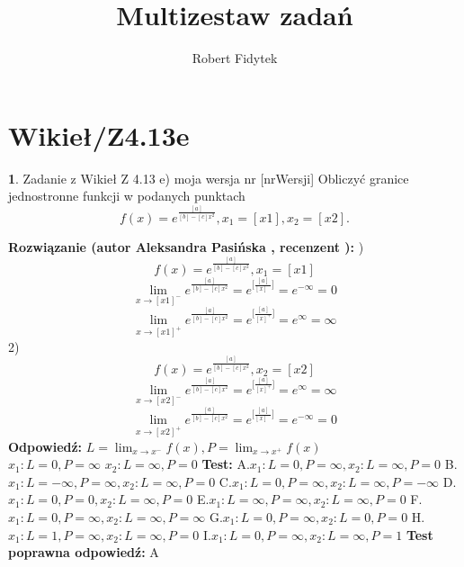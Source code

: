 \documentclass[12pt, a4paper]{article}
\title{Multizestaw zadań}
\author{Robert Fidytek}
\date{}
\theoremstyle{definition} %
\newtheorem{zad}{}
\newcommand{\kategoria}[1]{\section{#1}} %
\newcommand{\zadStart}[1]{\begin{zad}#1\newline} %
\newcommand{\zadStop}{\end{zad}}   %
\newcommand{\rozwStart}[2]{\noindent \textbf{Rozwiązanie (autor #1 , recenzent #2): }\newline} %
\newcommand{\rozwStop}{\newline}                                            %
\newcommand{\odpStart}{\noindent \textbf{Odpowiedź:}\newline}    %
\newcommand{\odpStop}{\newline}                                             %
\newcommand{\testStart}{\noindent \textbf{Test:}\newline} %
\newcommand{\testStop}{\newline} %
\newcommand{\kluczStart}{\noindent \textbf{Test poprawna odpowiedź:}\newline} %
\newcommand{\kluczStop}{\newline} %
\begin{document}
\maketitle


\kategoria{Wikieł/Z4.13e}
\zadStart{Zadanie z Wikieł Z 4.13 e) moja wersja nr [nrWersji]}
Obliczyć granice jednostronne funkcji w podanych punktach $$f(x)=e^\frac{[a]}{[b]-[c]x^2},x_{1}=[x1],x_{2}=[x2].$$
\zadStop
\rozwStart{Aleksandra Pasińska}{}
1)$$f(x)=e^\frac{[a]}{[b]-[c]x^2},x_{1}=[x1]$$
$$\lim_{x\rightarrow [x1]^-}e^\frac{[a]}{[b]-[c]x^2}=e^{\biggl[\frac{[a]}{[x]^-}\biggr]}=e^{-\infty}=0$$ 
$$\lim_{x\rightarrow [x1]^+}e^\frac{[a]}{[b]-[c]x^2}=e^{\biggl[\frac{[a]}{[x]^+}\biggr]}=e^{\infty}=\infty$$ 
2)$$f(x)=e^\frac{[a]}{[b]-[c]x^2},x_{2}=[x2]$$
$$\lim_{x\rightarrow [x2]^-}e^\frac{[a]}{[b]-[c]x^2}=e^{\biggl[\frac{[a]}{[x]^+}\biggr]}=e^{\infty}=\infty$$ 
$$\lim_{x\rightarrow [x2]^+}e^\frac{[a]}{[b]-[c]x^2}=e^{\biggl[\frac{[a]}{[x]^-}\biggr]}=e^{-\infty}=0$$ 
\rozwStop
\odpStart
$L=\lim_{x\rightarrow x^-}f(x),P=\lim_{x\rightarrow x^+}f(x)$\\
$x_{1}:L=0, P=\infty$
$x_{2}:L=\infty, P=0$
\odpStop
\testStart
A.$x_{1}:L=0, P=\infty, x_{2}:L=\infty, P=0$
B.$x_{1}:L=-\infty, P=\infty, x_{2}:L=\infty, P=0$
C.$x_{1}:L=0, P=\infty, x_{2}:L=\infty, P=-\infty$
D.$x_{1}:L=0, P=0, x_{2}:L=\infty, P=0$
E.$x_{1}:L=\infty, P=\infty, x_{2}:L=\infty, P=0$
F.$x_{1}:L=0, P=\infty, x_{2}:L=\infty, P=\infty$
G.$x_{1}:L=0, P=\infty, x_{2}:L=0, P=0$
H.$x_{1}:L=1, P=\infty, x_{2}:L=\infty, P=0$
I.$x_{1}:L=0, P=\infty, x_{2}:L=\infty, P=1$
\testStop
\kluczStart
A
\kluczStop
\end{document}
